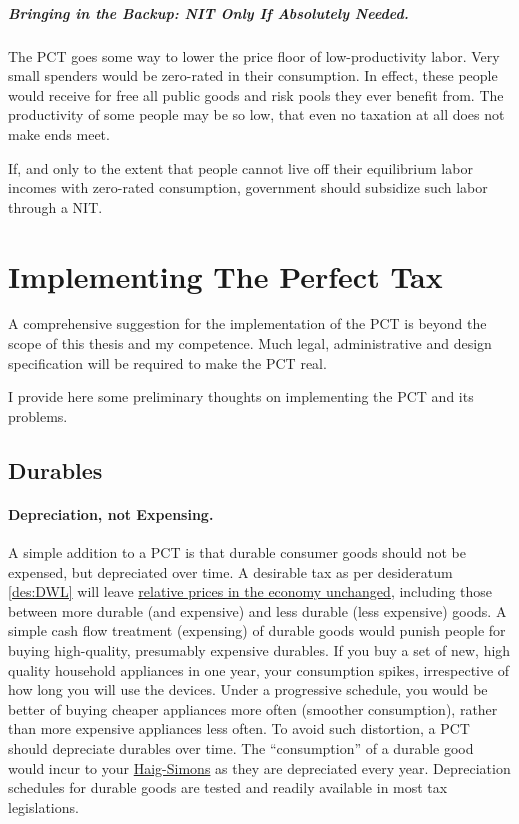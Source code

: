 \subparagraph{Bringing in the Backup: NIT Only If Absolutely Needed.} The PCT goes some way to lower the price floor of low-productivity labor. Very small spenders would be zero-rated in their consumption. In effect, these people would receive for free all public goods and risk pools they ever benefit from. The productivity of some people may be so low, that even no taxation at all does not make ends meet. 

If, and only to the extent that people cannot live off their equilibrium labor incomes with zero-rated consumption, government should subsidize such labor through a NIT. 

\section{Implementing The Perfect Tax} \label{sec:Implementation} A comprehensive suggestion for the implementation of the PCT is beyond the scope of this thesis and my competence. Much legal, administrative and design specification will be required to make the PCT real.

I provide here some preliminary thoughts on implementing the PCT and its problems.

\subsection{Durables}
\paragraph{Depreciation, not Expensing.} A simple addition to a PCT is that durable consumer goods should not be expensed, but depreciated over time. A desirable tax as per desideratum \ref{des:DWL} will leave \hyperref[des:DWL]{relative prices in the economy unchanged}, including those between more durable (and expensive) and less durable (less expensive) goods. A simple cash flow treatment (expensing) of durable goods would punish people for buying high-quality, presumably expensive durables. If you buy a set of new, high quality household appliances in one year, your consumption spikes, irrespective of how long you will use the devices. Under a progressive schedule, you would be better of buying cheaper appliances more often (smoother consumption), rather than more expensive appliances less often. To avoid such distortion, a PCT should depreciate durables over time. The ``consumption'' of a durable good would incur to your \hyperref[eq:HaigSimonsPCT]{Haig-Simons} as they are depreciated every year. Depreciation schedules for durable goods are tested and readily available in most tax legislations. %

